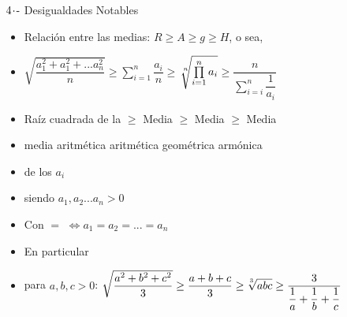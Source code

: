$4\hspace{-0.05cm}\cdot\hspace{-0.05cm}\text{-}$ Desigualdades Notables
\begin{itemize}
    \def\labelitemi{-}
    \addtolength{\itemindent}{0.5cm}
    \item Relación entre las medias: $R \ge A \ge g \ge H$, o sea,
    \item[] $\sqrt{\dfrac{a_{1}^2 + a_{1}^2 + ... a_{n}^2}{n}}$\hspace{1.1cm}$\ge$\hspace{0.7cm}$\sum\limits_{i=1}^{n}\dfrac{a_i}{n}$\hspace{0.7cm}$\ge$\hspace{0.4cm}$\sqrt[\leftroot{-2}\uproot{2}n]{\prod\limits_{i=1}^{n}a_i}$\hspace{0.7cm}$\ge$\hspace{0.6cm}$\dfrac{n}{\sum\limits_{i=i}^{n}\dfrac{1}{a_i}}$
    \item[] Raíz cuadrada de la \hspace{0.4cm} $\ge$ \hspace{0.4cm} Media \hspace{0.4cm} $\ge$ \hspace{0.4cm} Media  \hspace{0.4cm} $\ge$ \hspace{0.4cm} Media \vspace{-0.3cm}
    \item[]\hspace{0.2cm} media aritmética \hspace{1.35cm} aritmética \hspace{0.6cm} geométrica \hspace{.7cm} armónica \vspace{-0.3cm}
    \item[] \hspace{1cm} de los $a_i$
    \item[] siendo $a_1, a_2 ... a_n > 0$ \vspace{-0.3cm}
    \item[] Con $=$ $\Longleftrightarrow a_1 = a_2 = ... = a_n$
    \item[] En particular \vspace{-0.3cm}
    \item[] para $a,b,c > 0$: $\sqrt{\dfrac{a^2 + b^2 + c^2}{3}} \ge \dfrac{a+b+c}{3} \ge \sqrt[\leftroot{1}\uproot{2}3]{abc} \ge \dfrac{3}{\dfrac{1}{a}+\dfrac{1}{b}+\dfrac{1}{c}}$
    

\end{itemize}

